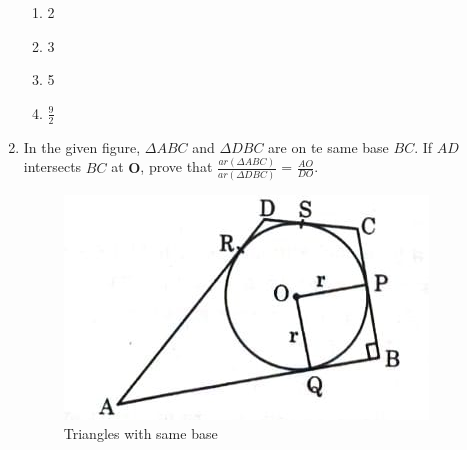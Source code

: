 \documentclass{article}
\let\vec\mathbf
\begin{document}
\begin{enumerate}
			\begin{enumerate}
				\item 2
				\item 3
				\item 5
				\item $\frac{9}{2}$
			\end{enumerate}

		\newpage

	\item In the given figure, $\Delta ABC$ and $\Delta DBC$ are on te same base $BC$. If $AD$ intersects $BC$ at $\vec{O}$, prove that $\frac { ar(\Delta ABC)}{ar (\Delta DBC)}$ = $\frac{AO}{DO}$.

		\begin{figure}[h!]
			\centering
			\includegraphics [width=\columnwidth] {figs/fig3.jpg}
			\caption{Triangles with same base}
			\label{fig:fig3.jpg}
		\end{figure}
\end{enumerate}

\pagebreak
\end{document}
